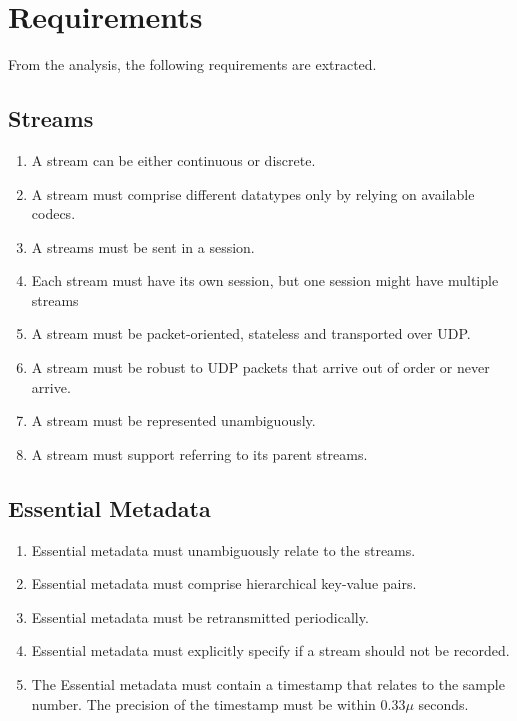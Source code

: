 \section{Requirements} \label{sec:requirements}
From the analysis, the following requirements are extracted.
\subsection{Streams} \label{sec:analysis:streamsreq}
\begin{enumerate}[ref=R-A-ST-\arabic* on P.\thepage]
	\item A stream can be either continuous or discrete.  \label{req:a:stream:conordisc}
	\item A stream must comprise different datatypes only by relying on available codecs. \label{req:a:stream:nocodec}
    \item A streams must be sent in a session. \label{req:a:stream:session}
    \item Each stream must have its own session, but one session might have multiple streams \label{req:a:stream:streamtosession}
	\item A stream must be packet-oriented, stateless and transported over UDP.\label{req:a:stream:udp}
	\item A stream must be robust to UDP packets that arrive out of order or never arrive. \label{req:a:stream:robustudp}
	\item A stream must be represented unambiguously. \label{req:a:stream:unambi}
	\item A stream must support referring to its parent streams. \label{req:a:stream:parent}
\end{enumerate}

\subsection{Essential Metadata} \label{sec:analysis:essentialmetadatareq}
\begin{enumerate}[ref=R-A-EM-\arabic* on P.\thepage]
	\item Essential metadata must unambiguously relate to the streams. \label{req:a:emeta:unamb}
	\item Essential metadata must comprise hierarchical key-value pairs. \label{req:a:emeta:keyvalue}
	\item Essential metadata must be retransmitted periodically. \label{req:a:emeta:retransmit}
	\item Essential metadata must explicitly specify if a stream should not be recorded. \label{req:a:emeta:notrecord}
	\item The Essential metadata must contain a timestamp that relates to the sample number. The precision of the timestamp must be within $0.33\mu$ seconds. \label{req:a:emeta:timestamp}
\end{enumerate}

